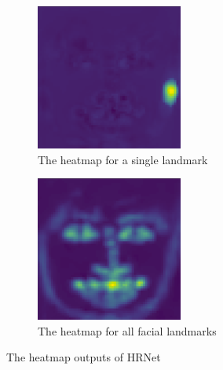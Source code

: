 \begin{figure}[h]
    \centering
    \begin{subfigure}{0.25\textwidth}
        \centering
        \includegraphics[width=\textwidth]{dissertation/figures/hrnet-single.png}
        \caption{The heatmap for a single landmark}
        \label{fig:hrnet-single}
    \end{subfigure}
    \hspace{3cm}
    \begin{subfigure}{0.25\textwidth}
        \centering
        \includegraphics[width=\textwidth]{dissertation/figures/hrnet-multiple.png}
        \caption{The heatmap for all facial landmarks}
        \label{fig:hrnet-multiple}
    \end{subfigure}
    \caption{The heatmap outputs of HRNet}
    \label{fig:hrnet-output}
\end{figure}

